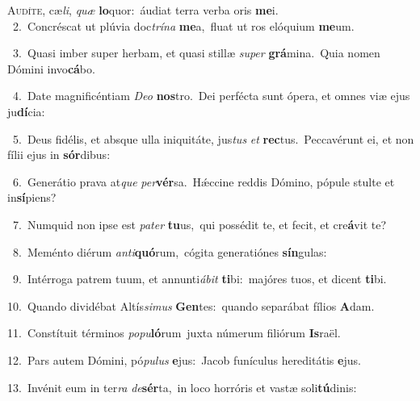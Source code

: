 \lettrine{\initial\textcolor{\initialcolor}{A}}{udíte,} cæ\-\textit{li}\-, \textit{quæ} \textbf{lo}\-quor:~\star áudiat terra verba oris \textbf{me}\-i.\\
{\numbfont\textcolor{\numbcolor}{~2.}}~Concréscat ut plúvia doc\-\textit{trí}\-\textit{na} \textbf{me}\-a,~\star fluat ut ros elóquium \textbf{me}\-um.\par
{\numbfont\textcolor{\numbcolor}{~3.}}~Quasi imber super herbam, et quasi stillæ \textit{su}\-\textit{per} \textbf{grá}\-mina.~\star Quia nomen Dómini invo\-\textbf{cá}\-bo.\par
{\numbfont\textcolor{\numbcolor}{~4.}}~Date magnificéntiam \textit{De}\-\textit{o} \textbf{nos}\-tro.~\star Dei perfécta sunt ópera, et omnes viæ ejus ju\-\textbf{dí}\-cia:\par
{\numbfont\textcolor{\numbcolor}{~5.}}~Deus fidélis, et absque ulla iniquitáte, jus\textit{tus} \textit{et} \textbf{rec}\-tus.~\star Peccavérunt ei, et non fílii ejus in \textbf{sór}\-dibus:\par
{\numbfont\textcolor{\numbcolor}{~6.}}~Generátio prava at\textit{que} \textit{per}\-\textbf{vér}sa.~\star Hǽccine reddis Dómino, pópule stulte et in\-\textbf{sí}\-piens?\par
{\numbfont\textcolor{\numbcolor}{~7.}}~Numquid non ipse est \textit{pa}\-\textit{ter} \textbf{tu}\-us,~\star qui possédit te, et fecit, et cre\-\textbf{á}\-vit te?\par
{\numbfont\textcolor{\numbcolor}{~8.}}~Meménto diérum \textit{an}\-\textit{ti}\textbf{quó}rum,~\star cógita generatiónes \textbf{sín}\-gulas:\par
{\numbfont\textcolor{\numbcolor}{~9.}}~Intérroga patrem tuum, et annunti\-\textit{á}\-\textit{bit} \textbf{ti}\-bi:~\star majóres tuos, et dicent \textbf{ti}\-bi.\par
{\numbfont\textcolor{\numbcolor}{10.}}~Quando dividébat Altís\-\textit{si}\-\textit{mus} \textbf{Gen}\-tes:~\star quando separábat fílios \textbf{A}\-dam.\par
{\numbfont\textcolor{\numbcolor}{11.}}~Constítuit términos \textit{po}\-\textit{pu}\textbf{ló}rum~\star juxta númerum filiórum \textbf{Is}\-raël.\par
{\numbfont\textcolor{\numbcolor}{12.}}~Pars autem Dómini, pó\-\textit{pu}\-\textit{lus} \textbf{e}\-jus:~\star Jacob funículus hereditátis \textbf{e}\-jus.\par
{\numbfont\textcolor{\numbcolor}{13.}}~Invénit eum in ter\textit{ra} \textit{de}\-\textbf{sér}ta,~\star in loco horróris et vastæ soli\-\textbf{tú}\-dinis:\par
